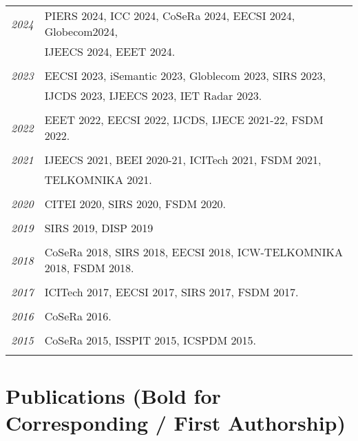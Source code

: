 \documentclass[paper=a4,fontsize=11pt]{scrartcl}
\begin{document}
\begin{longtable}{r|p{12cm}}
	\emph{2024} & PIERS 2024, ICC 2024, CoSeRa 2024, EECSI 2024, Globecom2024, \\
		& IJEECS 2024, EEET 2024. \\
	\multicolumn{2}{c}{} \\
	
	\emph{2023} & EECSI 2023, iSemantic 2023, Globlecom 2023, SIRS 2023, \\
		& IJCDS 2023, IJEECS 2023, IET Radar 2023. \\
	\multicolumn{2}{c}{} \\
	
	\emph{2022} & EEET 2022, EECSI 2022, IJCDS, IJECE 2021-22, FSDM 2022. \\
	\multicolumn{2}{c}{} \\
	
	\emph{2021} & IJEECS 2021, BEEI 2020-21, ICITech 2021, FSDM 2021, \\
		& TELKOMNIKA 2021. \\
	\multicolumn{2}{c}{} \\
	
	\emph{2020} & CITEI 2020, SIRS 2020, FSDM 2020. \\
	\multicolumn{2}{c}{} \\
	
	\emph{2019} & SIRS 2019, DISP 2019 \\
	\multicolumn{2}{c}{} \\
	
	\emph{2018} & CoSeRa 2018, SIRS 2018, EECSI 2018, ICW-TELKOMNIKA 2018, FSDM 2018.\\
	\multicolumn{2}{c}{} \\
	
	\emph{2017} & ICITech 2017, EECSI 2017, SIRS 2017, FSDM 2017.\\
	\multicolumn{2}{c}{} \\
	
	\emph{2016} & CoSeRa 2016.\\
	\multicolumn{2}{c}{} \\
	
	\emph{2015} & CoSeRa 2015, ISSPIT 2015, ICSPDM 2015.\\
	\multicolumn{2}{c}{} 
\end{longtable}






\section*{Publications (Bold for Corresponding / First Authorship)}
\end{document}
